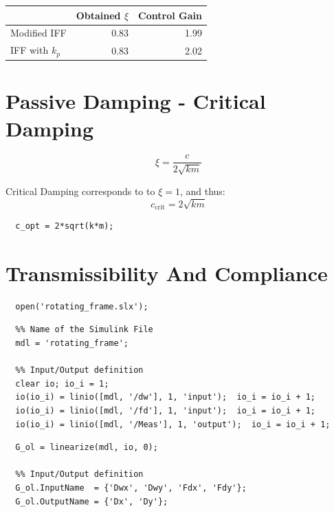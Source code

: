 \documentclass[a4paper, 10pt, DIV=12, parskip=full]{scrreprt}
\begin{document}
\begin{center}
\begin{tabular}{lrr}
 & Obtained \(\xi\) & Control Gain\\
\hline
Modified IFF & 0.83 & 1.99\\
IFF with \(k_p\) & 0.83 & 2.02\\
\end{tabular}
\end{center}

\section{Passive Damping - Critical Damping}
\label{sec:org81b0306}
\begin{equation}
  \xi = \frac{c}{2 \sqrt{km}}
\end{equation}

Critical Damping corresponds to to \(\xi = 1\), and thus:
\begin{equation}
  c_{\text{crit}} = 2 \sqrt{km}
\end{equation}

\begin{verbatim}
  c_opt = 2*sqrt(k*m);
\end{verbatim}

\section{Transmissibility And Compliance}
\label{sec:orge56633c}
\label{sec:comp_transmissibilty}

\begin{verbatim}
  open('rotating_frame.slx');
\end{verbatim}

\begin{verbatim}
  %% Name of the Simulink File
  mdl = 'rotating_frame';

  %% Input/Output definition
  clear io; io_i = 1;
  io(io_i) = linio([mdl, '/dw'], 1, 'input');  io_i = io_i + 1;
  io(io_i) = linio([mdl, '/fd'], 1, 'input');  io_i = io_i + 1;
  io(io_i) = linio([mdl, '/Meas'], 1, 'output');  io_i = io_i + 1;
\end{verbatim}
\begin{verbatim}
  G_ol = linearize(mdl, io, 0);

  %% Input/Output definition
  G_ol.InputName  = {'Dwx', 'Dwy', 'Fdx', 'Fdy'};
  G_ol.OutputName = {'Dx', 'Dy'};
\end{verbatim}
\end{document}
